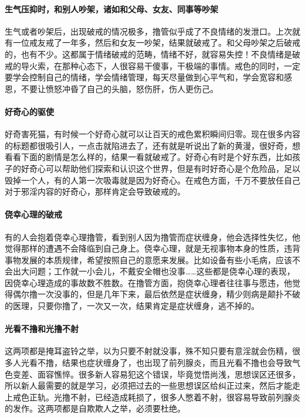 \paragraph{生气压抑时，和别人吵架，诸如和父母、女友、同事等吵架}

生气或者吵架后，出现破戒的情况极多，撸管似乎成了不良情绪的发泄口。上次就有一位戒友戒了一年多，然后和女友一吵架，结果就破戒了。和父母吵架之后破戒的，也有不少。这都属于情绪破戒的范畴，情绪不好，就容易失控！不良情绪是破戒的导火索，在那种心态下，人很容易干傻事，干极端的事情。戒色的同时，一定要学会控制自己的情绪，学会情绪管理，每天尽量做到心平气和，学会宽容和感恩，不要让愤怒冲昏了自己的头脑，怒伤肝，伤人更伤己。

\paragraph{好奇心的驱使}

好奇害死猫，有时候一个好奇心就可以让百天的戒色累积瞬间归零。现在很多内容的标题都很吸引人，一点击就陷进去了，还有就是听说出了新的黄漫，很好奇，想看看下面的剧情是怎么样的，结果一看就破戒了。好奇心有时是个好东西，比如孩子的好奇心可以帮助他们探索和认识这个世界，但是有时好奇心是个危险品，足以毁掉一个人，有的人第一次吸毒就是因为好奇心。在戒色方面，千万不要放任自己对于邪淫内容的好奇心，那样肯定会导致破戒的。

\paragraph{侥幸心理的破戒}

有的人会抱着侥幸心理撸管，看到别人因为撸管而症状缠身，他会选择性失忆，他觉得那样的遭遇不会降临到自己身上。侥幸心理，就是无视事物本身的性质，违背事物发展的本质规律，希望按照自己的意愿来发展。比如设备有些小毛病，应该不会出大问题；工作就一小会儿，不戴安全帽也没事……这些都是侥幸心理的表现，因侥幸心理造成的事故数不胜数。在撸管方面，抱侥幸心理者往往事与愿违，他觉得偶尔撸一次没事的，但是几年下来，最后依然是症状缠身，精少则病是颠扑不破的医理，只要你撸了，一次又一次，结果肯定是症状缠身，逃不掉的。

\paragraph{光看不撸和光撸不射}

这两项都是掩耳盗铃之举，以为只要不射就没事，殊不知只要有意淫就会伤精，很多人光看不撸，结果也症状缠身了，也出现了前列腺炎，而且光看不撸也会导致气色变差、面容憔悴。很多新人容易犯这个错误，毕竟觉悟尚浅，思想误区还很多，所以新人最需要的就是学习，必须把过去的一些思想误区给纠正过来，然后才能走上戒色正轨。光撸不射，已经造成耗损了，很多人憋着不射，很容易导致前列腺炎的发作。这两项都是自欺欺人之举，必须要杜绝。

